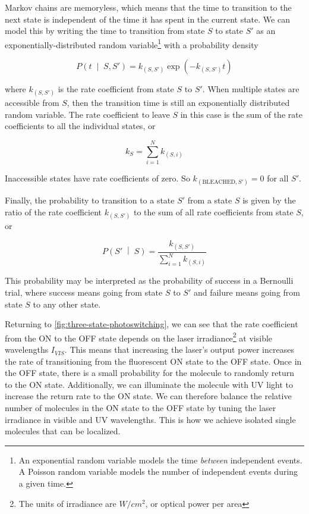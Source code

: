 \documentclass[10pt,a4paper]{book}
\newcommand{\given}{\;\middle|\;}
\begin{document}
Markov chains are memoryless, which means that the time to transition to the next state is independent of the time it has spent in the current state. We can model this by writing the time to transition from state $S$ to state $S'$ as an exponentially-distributed random variable\footnote{An exponential random variable models the time \textit{between} independent events. A Poisson random variable models the number of independent events during a given time.} with a probability density

\begin{equation}
    P \left(t \given S, S' \right) = k_{ \left( S, S' \right)} \exp \left( -k_{ \left( S, S' \right) } t \right)
\end{equation}

\noindent where $k_{ \left( S, S' \right)}$ is the rate coefficient from state $S$ to $S'$. When multiple states are accessible from $S$, then the transition time is still an exponentially distributed random variable. The rate coefficient to leave $S$ in this case is the sum of the rate coefficients to all the individual states, or

\begin{equation}
    k_S = \sum_{i = 1}^N k_{ \left( S, i \right) }
\end{equation}

\noindent Inaccessible states have rate coefficients of zero. So $k_{\left( \text{BLEACHED}, S' \right)} = 0$ for all $S'$.

Finally, the probability to transition to a state $S'$ from a state $S$ is given by the ratio of the rate coefficient $k_{ \left( S, S'\right)}$ to the sum of all rate coefficients from state $S$, or

\begin{equation}
    P \left(S' \given S \right) = \frac{k_{\left( S, S' \right)}}{\sum_{i = 1}^N k_{ \left( S, i \right) }}
\end{equation}

\noindent This probability may be interpreted as the probability of success in a Bernoulli trial, where success means going from state $S$ to $S'$ and failure means going from state $S$ to any other state.

Returning to \autoref{fig:three-state-photoswitching}, we can see that the rate coefficient from the ON to the OFF state depends on the laser irradiance\footnote{The units of irradiance are $W / cm^2$, or optical power per area} at visible wavelengths $I_{VIS}$. This means that increasing the laser's output power increases the rate of transitioning from the fluorescent ON state to the OFF state. Once in the OFF state, there is a small probability for the molecule to randomly return to the ON state. Additionally, we can illuminate the molecule with UV light to increase the return rate to the ON state. We can therefore balance the relative number of molecules in the ON state to the OFF state by tuning the laser irradiance in visible and UV wavelengths. This is how we achieve isolated single molecules that can be localized.
\end{document}
